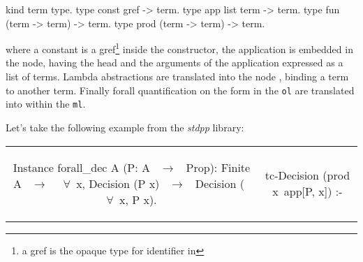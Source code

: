 \documentclass[sigconf,natbib=false]{acmart}
\def\elpi{\proglang{elpi}}
\def\coq{\proglang{coq}}
\newcommand{\library}[1]{\textit{#1}\xspace}
\def\stdpp{\library{stdpp}}
\newcommand*{\acronym}[1]{\texttt{#1}\xspace}
\def\ol{\acronym{ol}} %
\def\ml{\acronym{ml}} %
\begin{document}
\noindent %
  \begin{center}
    \begin{minipage}[c]{0.8\linewidth}
      \begin{elpicode}
        kind term type.
        type const gref -> term.
        type app list term -> term.
        type fun (term -> term) -> term.
        type prod (term -> term) -> term.
      \end{elpicode}
    \end{minipage}
  \end{center}

 
   
\noindent where a \coq constant is a gref\footnote{a gref is the opaque type for \coq
identifier in \elpi} inside the  constructor, the \coq application
is embedded in the  node, having the head and the arguments of the
application expressed as a list of terms. Lambda abstractions are translated
into the node , binding a term to another term. Finally forall
quantification on the form  in the \ol are translated
into  within the \ml.


Let's take the following example from the \stdpp library:

\noindent %
\begin{tabular}{c|c}
  \begin{minipage}[c]{0.50\linewidth}
    \begin{coqcode}
      Instance forall_dec A (P: A ~$\to$~ Prop):
        Finite A ~$\to$~ 
        ~$\forall$~x, Decision (P x) ~$\to$~
        Decision (~$\forall$~x, P x).
    \end{coqcode}
  \end{minipage}
  &
  \begin{minipage}[c]{0.46\linewidth}
    \begin{elpicode}
      tc-Decision (prod x\ app[P, x]) :- 
    \end{elpicode}
  \end{minipage}
\end{tabular}
\end{document}
